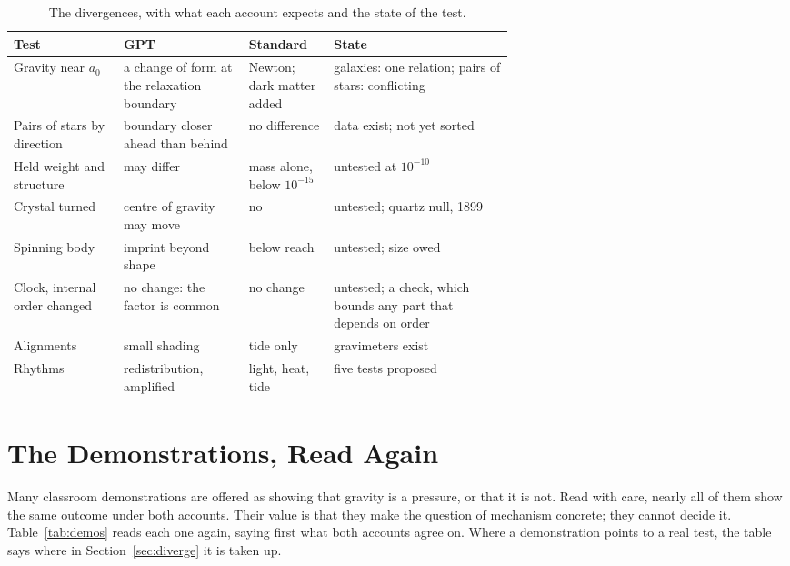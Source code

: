\begin{table}[t]\centering\small
\caption{The divergences, with what each account expects and the state of the test.}
\begin{tabularx}{\linewidth}{@{}>{\raggedright\arraybackslash}p{0.22\linewidth} >{\raggedright\arraybackslash}p{0.25\linewidth} >{\raggedright\arraybackslash}p{0.17\linewidth} >{\raggedright\arraybackslash}X@{}}\toprule
\textbf{Test} & \textbf{GPT} & \textbf{Standard} & \textbf{State}\\\midrule
Gravity near $a_0$ & a change of form at the relaxation boundary & Newton; dark matter added & galaxies: one relation; pairs of stars: conflicting\\
Pairs of stars by direction & boundary closer ahead than behind & no difference & data exist; not yet sorted\\
Held weight and structure & may differ & mass alone, below $10^{-15}$ & untested at $10^{-10}$\\
Crystal turned & centre of gravity may move & no & untested; quartz null, 1899\\
Spinning body & imprint beyond shape & below reach & untested; size owed\\
Clock, internal order changed & no change: the factor is common & no change & untested; a check, which bounds any part that depends on order\\
Alignments & small shading & tide only & gravimeters exist\\
Rhythms & redistribution, amplified & light, heat, tide & five tests proposed\\\bottomrule
\end{tabularx}\label{tab:tests}\end{table}

\section{The Demonstrations, Read Again}\label{sec:demos}

Many classroom demonstrations are offered as showing that gravity is a pressure, or that it is not. Read with care, nearly all of them show the same outcome under both accounts. Their value is that they make the question of mechanism concrete; they cannot decide it. Table~\ref{tab:demos} reads each one again, saying first what both accounts agree on. Where a demonstration points to a real test, the table says where in Section~\ref{sec:diverge} it is taken up.\nocite{rashadaPart6,rashadaPart7,rashadaPart11,rashadaPart22}

